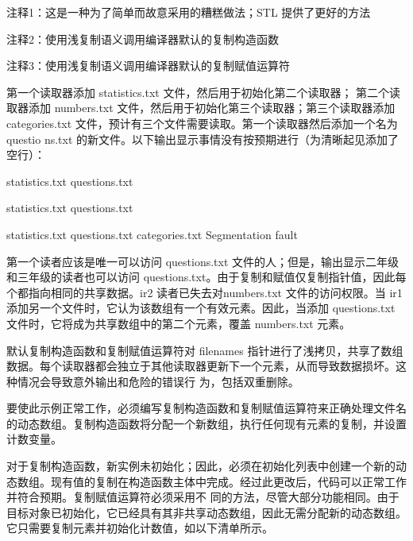 {\footnotesize
注释1：这是一种为了简单而故意采用的糟糕做法；STL 提供了更好的方法

注释2：使用浅复制语义调用编译器默认的复制构造函数

注释3：使用浅复制语义调用编译器默认的复制赋值运算符
}


第一个读取器添加 statistics.txt 文件，然后用于初始化第二个读取器； 第二个读取器添加 numbers.txt 文件，然后用于初始化第三个读取器；第三个读取器添加 categories.txt 文件，预计有三个文件需要读取。第一个读取器然后添加一个名为 questio ns.txt 的新文件。以下输出显示事情没有按预期进行（为清晰起见添加了空行）：

\begin{shell}
statistics.txt
questions.txt

statistics.txt
questions.txt

statistics.txt
questions.txt
categories.txt
Segmentation fault
\end{shell}

第一个读者应该是唯一可以访问 questions.txt 文件的人；但是，输出显示二年级和三年级的读者也可以访问 questions.txt。由于复制和赋值仅复制指针值，因此每个都指向相同的共享数据。ir2 读者已失去对numbers.txt 文件的访问权限。当 ir1 添加另一个文件时，它认为该数组有一个有效元素。因此，当添加 questions.txt 文件时，它将成为共享数组中的第二个元素，覆盖 numbers.txt 元素。

默认复制构造函数和复制赋值运算符对 filenames 指针进行了浅拷贝，共享了数组数据。每个读取器都会独立于其他读取器更新下一个元素，从而导致数据损坏。这种情况会导致意外输出和危险的错误行 为，包括双重删除。


要使此示例正常工作，必须编写复制构造函数和复制赋值运算符来正确处理文件名的动态数组。复制构造函数将分配一个新数组，执行任何现有元素的复制，并设置计数变量。

对于复制构造函数，新实例未初始化；因此，必须在初始化列表中创建一个新的动态数组。现有值的复制在构造函数主体中完成。经过此更改后，代码可以正常工作并符合预期。复制赋值运算符必须采用不 同的方法，尽管大部分功能相同。由于目标对象已初始化，它已经具有其非共享动态数组，因此无需分配新的动态数组。它只需要复制元素并初始化计数值，如以下清单所示。


